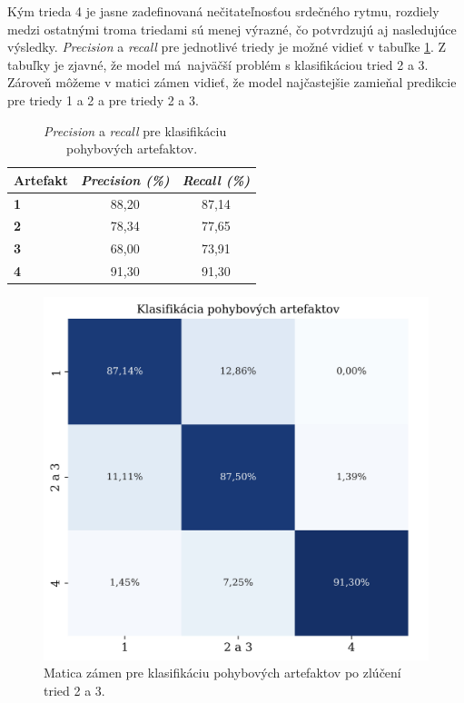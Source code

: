 Kým trieda 4 je jasne zadefinovaná nečitateľnosťou srdečného rytmu, rozdiely medzi ostatnými troma triedami sú menej výrazné, čo potvrdzujú aj nasledujúce výsledky. \textit{Precision} a \textit{recall} pre jednotlivé triedy je možné vidieť v tabuľke \ref{tab:artefact_classification}. Z tabuľky je zjavné, že model má~najväčší problém s klasifikáciou tried 2 a 3. Zároveň môžeme v matici zámen vidieť, že model najčastejšie zamieňal predikcie pre triedy 1 a 2 a pre triedy 2 a 3. 

\begin{table}[H]\centering
\caption[\textit{Precision} a \textit{recall} pre klasifikáciu pohybových artefaktov.]{~\textit{Precision} a \textit{recall} pre klasifikáciu pohybových artefaktov.}\label{tab:artefact_classification}
    \begin{tabular}{l|c|c}
    	\textbf{Artefakt} & \textit{\textbf{Precision (\%)}} & \textit{\textbf{Recall (\%)}} \tabularnewline \hline 
     	\textbf{1}        & 88,20	                      &  87,14                           \tabularnewline \hline
     	\textbf{2}	      & 78,34	                      &  77,65                           \tabularnewline \hline
        \textbf{3}	      & 68,00	                      &  73,91                           \tabularnewline \hline
        \textbf{4}	      & 91,30	                      &  91,30                           \tabularnewline
    \end{tabular}
\end{table}


\begin{figure}[H]
    \centering    
    \includegraphics[scale=0.07]{img/confusion_matrix_merged.jpeg}
    \caption{Matica zámen pre klasifikáciu pohybových artefaktov po zlúčení tried 2 a 3.}
    \label{fig:artefact_classification_merged}
\end{figure}

